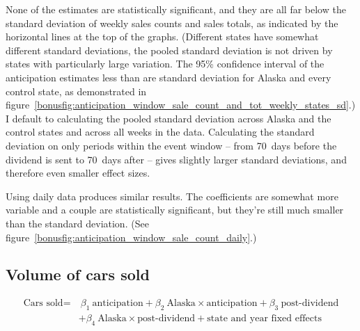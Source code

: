 \documentclass[11pt,letterpaper,oneside]{article}
\newcommand{\snippet}[1]{\hspace{-0.15em}}
\begin{document}
None of the estimates are statistically significant, and they are all far below the standard deviation of weekly sales counts and sales totals, as indicated by the horizontal lines at the top of the graphs.
(Different states have somewhat different standard deviations, the pooled standard deviation is not driven by states with particularly large variation.
The 95\% confidence interval of the anticipation estimates less than are standard deviation for Alaska and every control state, as demonstrated in figure~\ref{bonusfig:anticipation_window_sale_count_and_tot_weekly_states_sd}.)
I default to calculating the pooled standard deviation across Alaska and the control states and across all weeks in the data.
Calculating the standard deviation on only periods within the event window -- from 70~days before the dividend is sent to 70~days after -- gives slightly larger standard deviations, and therefore even smaller effect sizes.

Using daily data produces similar results.
The coefficients are somewhat more variable and a couple are statistically significant, but they're still much smaller than the standard deviation.
(See figure~\ref{bonusfig:anticipation_window_sale_count_daily}.)





%

\subsection{Volume of cars sold}
\begin{align}
    \label{eqn:cars_sold_with_anticipation}
    \text{Cars sold} = & \ \beta_1 \ \text{anticipation} + \beta_2 \ \text{Alaska} \times \text{anticipation} + \beta_3 \ \text{post-dividend} \\ \nonumber
    &+ \beta_4 \ \text{Alaska} \times \text{post-dividend} + \text{state and year fixed effects}
\end{align}
\end{document}
